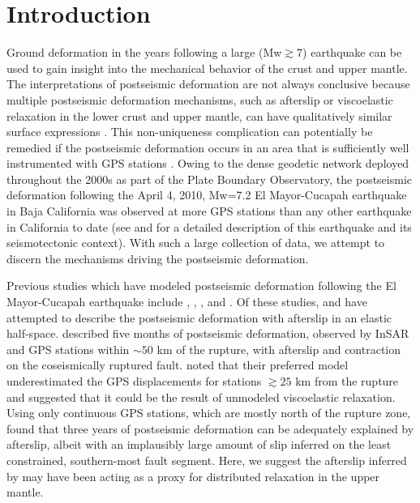 \documentclass[draft,linenumbers]{AGUJournal}
\begin{document}
\section{Introduction}
Ground deformation in the years following a large (Mw$\gtrsim$7) earthquake can be used to gain insight into the mechanical behavior of the crust and upper mantle. The interpretations of postseismic deformation are not always conclusive because multiple postseismic deformation mechanisms, such as afterslip or viscoelastic relaxation in the lower crust and upper mantle, can have qualitatively similar surface expressions \citep[e.g.][]{Savage1990}. This non-uniqueness complication can potentially be remedied if the postseismic deformation occurs in an area that is sufficiently well instrumented with GPS stations \citep{Hearn2003}.  Owing to the dense geodetic network deployed throughout the 2000s as part of the Plate Boundary Observatory, the postseismic deformation following the April 4, 2010, Mw=7.2 El Mayor-Cucapah earthquake in Baja California was observed at more GPS stations than any other earthquake in California to date (see \citet{Hauksson2011} and \citet{Fletcher2014} for a detailed description of this earthquake and its seismotectonic context).  With such a large collection of data, we attempt to discern the mechanisms driving the postseismic deformation. 

Previous studies which have modeled postseismic deformation following the El Mayor-Cucapah earthquake include \citet{Pollitz2012}, \citet{Gonzalez-ortega2014}, \citet{Spinler2015}, and \citet{Rollins2015}. Of these studies, \citet{Gonzalez-ortega2014} and \citet{Rollins2015} have attempted to describe the postseismic deformation with afterslip in an elastic half-space.  \citet{Gonzalez-ortega2014} described five months of postseismic deformation, observed by InSAR and GPS stations within ${\sim}50$ km of the rupture, with afterslip and contraction on the coseismically ruptured fault. \citet{Gonzalez-ortega2014} noted that their preferred model underestimated the GPS displacements for stations $\gtrsim 25$ km from the rupture and suggested that it could be the result of unmodeled viscoelastic relaxation.  Using only continuous GPS stations, which are mostly north of the rupture zone, \citet{Rollins2015} found that three years of postseismic deformation can be adequately explained by afterslip, albeit with an implausibly large amount of slip inferred on the least constrained, southern-most fault segment. Here, we suggest the afterslip inferred by \citet{Rollins2015} may have been acting as a proxy for distributed relaxation in the upper mantle. 
\end{document}
